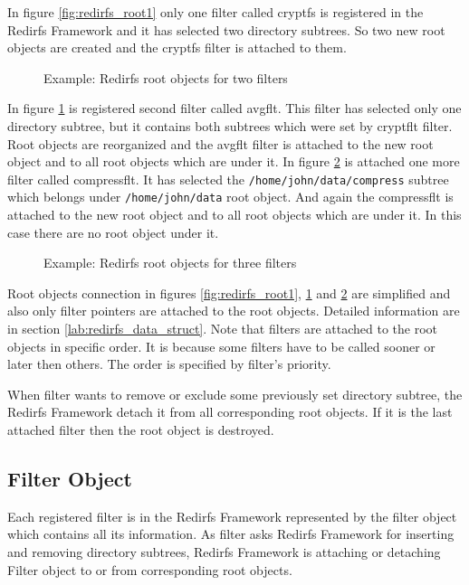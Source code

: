 In figure \ref{fig:redirfs_root1} only one filter called cryptfs is registered in
the Redirfs Framework and it has selected two directory subtrees. So two new root
objects are created and the cryptfs filter is attached to them.

\begin{figure}[hp]
	\begin{center}
		
	\end{center}
	\caption{Example: Redirfs root objects for two filters}
	\label{fig:redirfs_root2}
\end{figure}

In figure \ref{fig:redirfs_root2} is registered second filter called avgflt. This
filter has selected only one directory subtree, but it contains both 
subtrees which were set by cryptflt filter. Root objects are reorganized and the
avgflt filter is attached to the new root object and to all root objects which are under it.
In figure \ref{fig:redirfs_root3} is attached one more filter called compressflt. It
has selected the \texttt{/home/john/data/compress} subtree which belongs under
\texttt{/home/john/data} root object. And again the compressflt is attached to the new
root object and to all root objects which are under it. In this case there are no root
object under it.

\begin{figure}[hp]
	\begin{center}
		
	\end{center}
	\caption{Example: Redirfs root objects for three filters}
	\label{fig:redirfs_root3}
\end{figure}

Root objects connection in figures \ref{fig:redirfs_root1}, \ref{fig:redirfs_root2}
and \ref{fig:redirfs_root3} are simplified and also only filter pointers are attached
to the root objects. Detailed information are in section
\ref{lab:redirfs_data_struct}. Note that filters are attached to the root objects in
specific order. It is because some filters have to be called sooner or later then
others. The order is specified by filter's priority.

When filter wants to remove or exclude some previously set directory subtree, the
Redirfs Framework detach it from all corresponding root objects. If it is the last
attached filter then the root object is destroyed.

\subsection{Filter Object}
Each registered filter is in the Redirfs Framework represented by the filter object
which contains all its information. As filter asks Redirfs Framework for inserting and
removing directory subtrees, Redirfs Framework is attaching or detaching Filter object
to or from corresponding root objects.

